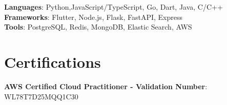 \documentclass[margin, 11pt]{res}
\begin{document}
\begin{resume}
\textbf{Languages}{: Python,JavaScript/TypeScript, Go, Dart, Java, C/C++} \\
\textbf{Frameworks}{: Flutter, Node.js, Flask, FastAPI, Express} \\
\textbf{Tools}{: PostgreSQL, Redis, MongoDB, Elastic Search, AWS} 

\section{\sc Certifications}
\textbf{AWS Certified Cloud Practitioner - Validation Number}{: WL78T7D25MQQ1C30} \\

\vspace{0.2in}

\end{resume}
\end{document}
